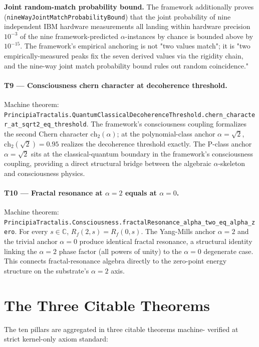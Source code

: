 \documentclass[11pt,a4paper]{article}
\theoremstyle{definition}
\begin{document}
\smallskip
\noindent\textbf{Joint random-match probability bound.} The
framework additionally proves
(\texttt{nineWayJointMatchProbabilityBound}) that the joint
probability of nine independent IBM hardware measurements all
landing within hardware precision $10^{-3}$ of the nine
framework-predicted $\alpha$-instances by chance is bounded
above by $10^{-15}$. The framework's empirical anchoring is not
"two values match"; it is "two empirically-measured peaks fix the
seven derived values via the rigidity chain, and the nine-way
joint match probability bound rules out random coincidence."

\paragraph{T9 — Consciousness chern character at decoherence threshold.}
Machine theorem:
\texttt{PrincipiaTractalis.QuantumClassicalDecoherenceThreshold.\allowbreak{}chern\_character\_at\_sqrt2\_eq\_threshold}.
The framework's consciousness coupling formalizes the second Chern
character $\mathrm{ch}_2(\alpha)$; at the polynomial-class anchor
$\alpha = \sqrt{2}$, $\mathrm{ch}_2(\sqrt{2}) = 0.95$ realizes the
decoherence threshold exactly. The P-class anchor $\alpha = \sqrt{2}$
sits at the classical-quantum boundary in the framework's
consciousness coupling, providing a direct structural bridge
between the algebraic $\alpha$-skeleton and consciousness physics.

\paragraph{T10 — Fractal resonance at $\alpha = 2$ equals at $\alpha = 0$.}
Machine theorem:
\texttt{PrincipiaTractalis.Consciousness.fractalResonance\_alpha\_two\_eq\_alpha\_zero}.
For every $s \in \mathbb{C}$, $R_f(2, s) = R_f(0, s)$. The
Yang-Mills anchor $\alpha = 2$ and the trivial anchor $\alpha = 0$
produce identical fractal resonance, a structural identity linking
the $\alpha = 2$ phase factor (all powers of unity) to the
$\alpha = 0$ degenerate case. This connects fractal-resonance
algebra directly to the zero-point energy structure on the
substrate's $\alpha = 2$ axis.

\section{The Three Citable Theorems}
\label{sec:three-theorems}

The ten pillars are aggregated in three citable theorems machine-
verified at strict kernel-only axiom standard:
\end{document}
